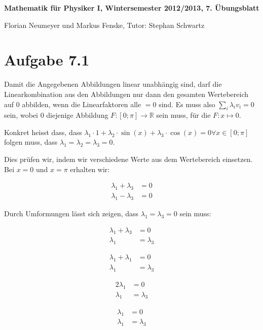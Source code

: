 \documentclass[a4paper,german,12pt,smallheadings]{scrartcl}
\begin{document}
\begin{center}
\bfseries %
\sffamily %
\vspace{-40pt}
Mathematik für Physiker I, Wintersemester 2012/2013, 7. Übungsblatt

Florian Neumeyer und Markus Fenske, Tutor: Stephan Schwartz
\vspace{-10pt}
\end{center}

\section*{Aufgabe 7.1}

Damit die Angegebenen Abbildungen linear unabhängig sind, darf die
Linearkombination aus den Abbildungen nur dann den gesamten Wertebereich auf
${0}$ abbilden, wenn die Linearfaktoren alle $= 0$ sind. Es muss also $\sum_{i}
\lambda_{i} v_i = 0$ sein, wobei $0$ diejenige Abbildung $F:
[0;\pi] \to \mathbb{R}$ sein muss, für die $F: x \mapsto 0$.

Konkret heisst dass, dass $\lambda_1 \cdot 1 + \lambda_2 \cdot \sin(x) +
\lambda_3 \cdot \cos(x) = 0 \forall x \in [0;\pi]$ folgen muss, dass $\lambda_1 = \lambda_2 =
\lambda_3 = 0$.

Dies prüfen wir, indem wir verschiedene Werte aus dem Wertebereich einsetzen.
Bei $x = 0$ und $x = \pi$ erhalten wir:

\begin{align*}
\lambda_1 + \lambda_3 &= 0 \\
\lambda_1 - \lambda_3 &= 0
\end{align*}

Durch Umformungen lässt sich zeigen, dass $\lambda_1 = \lambda_3 = 0$ sein muss:

\begin{align*}
\lambda_1 + \lambda_3 &= 0 \\
\lambda_1 &= \lambda_3
\end{align*}

\begin{align*}
\lambda_1 + \lambda_1 &= 0 \\
\lambda_1 &= \lambda_3
\end{align*}

\begin{align*}
2\lambda_1 &= 0 \\
\lambda_1 &= \lambda_3
\end{align*}

\begin{align*}
\lambda_1 &= 0 \\
\lambda_1 &= \lambda_3
\end{align*}
\end{document}

